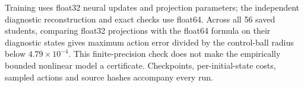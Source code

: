 \par
Training uses float32 neural updates and projection parameters; the independent diagnostic reconstruction and exact checks use float64. Across all 56 saved students, comparing float32 projections with the float64 formula on their diagnostic states gives maximum action error divided by the control-ball radius below $4.79\times10^{-4}$. This finite-precision check does not make the empirically bounded nonlinear model a certificate. Checkpoints, per-initial-state costs, sampled actions and source hashes accompany every run.
